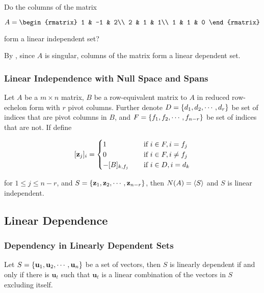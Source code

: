 \documentclass[a4paper,12pt]{article}
\begin{document}
\begin{exm}
  Do the columns of the matrix

  $$A=\begin{rmatrix}
    1 & -1 & 2\\
    2 & 1 & 1\\
    1 & 1 & 0
  \end{rmatrix}$$\s

  form a linear independent set?\n

  \ans By \rthm[\sctr{2}], since $A$ is singular, columns of the matrix form a linear dependent set.
\end{exm}

\subsubsection{Linear Independence with Null Space and Spans}
\begin{thm}
  Let $A$ be a $m\times n$ matrix, $B$ be a row-equivalent matrix to $A$ in reduced row-echelon form with $r$ pivot columns. Further denote $D=\left\{ d_{1},d_{2},\cdots,d_{r}\right\}$ be set of indices that are pivot columns in $B$, and $F=\left\{ f_{1},f_{2},\cdots,f_{n-r}\right\}$ be set of indices that are not. If define

  $$[\mathbf{z}_{j}]_{i}=\begin{cases}
    1&\;\;\;\;\text{if }i\in F,i=f_{j}\\
    0&\;\;\;\;\text{if }i\in F,i\neq f_{j}\\
    -[B]_{k,f_{j}}&\;\;\;\;\text{if }i\in D,i=d_{k}
  \end{cases}$$\s

  for $1\leq j\leq n-r$, and $S=\left\{ \mathbf{z}_{1},\mathbf{z}_{2},\cdots,\mathbf{z}_{n-r}\right\}$, then $N(A)=\left\langle S\right\rangle$ and $S$ is linear independent.
\end{thm}

\subsection{Linear Dependence}
\subsubsection{Dependency in Linearly Dependent Sets}
\begin{thm}
  Let $S=\left\{ \mathbf{u}_{1},\mathbf{u}_{2},\cdots,\mathbf{u}_{n}\right\}$ be a set of vectors, then $S$ is linearly dependent if and only if there is $\mathbf{u}_{t}$ such that $\mathbf{u}_{t}$ is a linear combination of the vectors in $S$ excluding itself.
\end{thm}
\end{document}
